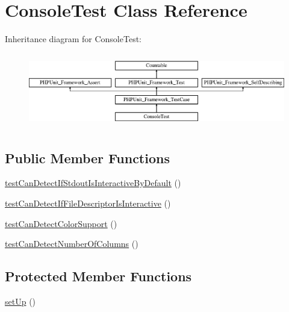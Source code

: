 \hypertarget{class_sebastian_bergmann_1_1_environment_1_1_console_test}{}\section{Console\+Test Class Reference}
\label{class_sebastian_bergmann_1_1_environment_1_1_console_test}
Inheritance diagram for Console\+Test\+:\begin{figure}[H]
\begin{center}
\leavevmode
\includegraphics[height=3.303835cm]{class_sebastian_bergmann_1_1_environment_1_1_console_test}
\end{center}
\end{figure}
\subsection*{Public Member Functions}
\begin{DoxyCompactItemize}
\item 
\mbox{\hyperlink{class_sebastian_bergmann_1_1_environment_1_1_console_test_a93eec5b551fed5e7e3937beddcafa5b0}{test\+Can\+Detect\+If\+Stdout\+Is\+Interactive\+By\+Default}} ()
\item 
\mbox{\hyperlink{class_sebastian_bergmann_1_1_environment_1_1_console_test_a1368030694b948d0bca142aad4d91060}{test\+Can\+Detect\+If\+File\+Descriptor\+Is\+Interactive}} ()
\item 
\mbox{\hyperlink{class_sebastian_bergmann_1_1_environment_1_1_console_test_abd61cfb9e55ec194bab03e24d2b2b985}{test\+Can\+Detect\+Color\+Support}} ()
\item 
\mbox{\hyperlink{class_sebastian_bergmann_1_1_environment_1_1_console_test_a99b1f7e261469346563ca856bada18db}{test\+Can\+Detect\+Number\+Of\+Columns}} ()
\end{DoxyCompactItemize}
\subsection*{Protected Member Functions}
\begin{DoxyCompactItemize}
\item 
\mbox{\hyperlink{class_sebastian_bergmann_1_1_environment_1_1_console_test_a0bc688732d2b3b162ffebaf7812e78da}{set\+Up}} ()
\end{DoxyCompactItemize}

